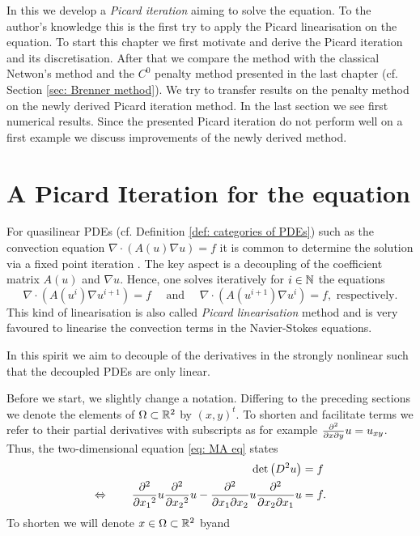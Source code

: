 In this we develop a \emph{Picard iteration} aiming to solve the \MA equation. To the author's knowledge this is the first try to apply the Picard linearisation on the \MA equation. 
To start this chapter we first motivate and derive the Picard iteration and its discretisation.
After that we compare the method with the classical Netwon's method and the $C^0$ penalty method presented in the last chapter (cf. Section \ref{sec: Brenner method}). We try to transfer results on the penalty method on the newly derived Picard iteration method. 
In the last section we see first numerical results. Since the presented Picard iteration do not perform well on a first example we discuss improvements of the newly derived method.


\section{A Picard Iteration for the \MA equation} \label{sec: motivation picard iteration}
For quasilinear PDEs (cf. Definition \ref{def: categories of PDEs}) such as the convection equation $\nabla \cdot (A(u) \nabla u ) = f$ it is common to determine the solution via a fixed point iteration \cite{Deblois1997,LL1995,MNK2009}. The key aspect is a decoupling of the coefficient matrix $A(u)$ and $\nabla u$. Hence, one solves iteratively  for $i\in \mathbb{N}$ the equations
\[
	\nabla \cdot (A(u^{i} )\nabla u^{i+1}) = f   \quad \text{      and      }\quad \nabla \cdot (A(u^{i+1}) \nabla u^{i}) = f, \text{ respectively}.
\] 
This kind of linearisation is also called \emph{Picard linearisation} method and is very favoured to linearise the convection terms in the Navier-Stokes equations.

In this spirit we aim to decouple of the derivatives in the strongly nonlinear \MA such that the decoupled PDEs are only linear. 

Before we start, we slightly change a notation. Differing to the preceding sections we denote the elements of $\Omega \subset \mathbb{R}^2$ by  $(x,y)^t$. To shorten and facilitate terms we refer to their partial derivatives with subscripts as for example $\frac {\partial^2} {\partial x\partial y} u = u_{xy}$.
Thus, the two-dimensional \MA equation \eqref{eq: MA eq} states
\begin{align}
 \det{\left(D^2 u\right)} &= f \nonumber \\
 	\Leftrightarrow \qquad  \frac {\partial^2} {\partial {x_1}^2} u \frac {\partial^2} {\partial {x_2}^2} u -\frac {\partial^2} {\partial x_1\partial x_2} u \frac {\partial^2} {\partial x_2\partial x_1} u  &= f. \label{eq:mongeAmpere detForm}
\end{align}
To shorten we will denote $x \in \Omega \subset {\mathbb{R}^2} $ byand 

